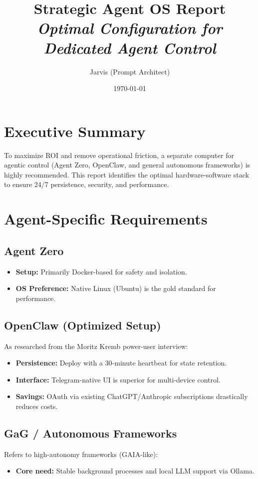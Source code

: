 \documentclass[11pt]{article}
\title{\LARGE \textbf{\textcolor{primary}{Strategic Agent OS Report}} \\ \large \textit{Optimal Configuration for Dedicated Agent Control}}
\author{Jarvis (Prompt Architect)}
\date{\today}
\begin{document}
\maketitle

\section{Executive Summary}
To maximize ROI and remove operational friction, a separate computer for agentic control (Agent Zero, OpenClaw, and general autonomous frameworks) is highly recommended. This report identifies the optimal hardware-software stack to ensure 24/7 persistence, security, and performance.

\section{Agent-Specific Requirements}

\subsection{Agent Zero}
\begin{itemize}
    \item \textbf{Setup:} Primarily Docker-based for safety and isolation.
    \item \textbf{OS Preference:} Native Linux (Ubuntu) is the gold standard for performance.
\end{itemize}

\subsection{OpenClaw (Optimized Setup)}
As researched from the Moritz Kremb power-user interview:
\begin{itemize}
    \item \textbf{Persistence:} Deploy with a 30-minute heartbeat for state retention.
    \item \textbf{Interface:} Telegram-native UI is superior for multi-device control.
    \item \textbf{Savings:} OAuth via existing ChatGPT/Anthropic subscriptions drastically reduces costs.
\end{itemize}

\subsection{GaG / Autonomous Frameworks}
Refers to high-autonomy frameworks (GAIA-like):
\begin{itemize}
    \item \textbf{Core need:} Stable background processes and local LLM support via Ollama.
\end{itemize}
\end{document}
